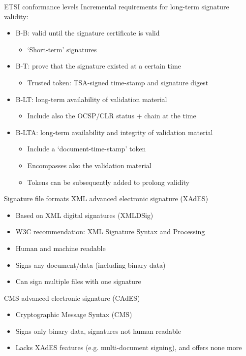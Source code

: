 \begin{frame}{ETSI conformance levels}
  \pause
  Incremental requirements for long-term signature validity:
  \begin{itemize}[<+(1)->]
    \item B-B: valid until the signature certificate is valid
    \begin{itemize}
      \item `Short-term' signatures
    \end{itemize}
    \item B-T: prove that the signature existed at a certain time
    \begin{itemize}
      \item Trusted token: TSA-signed time-stamp and signature digest
    \end{itemize}
    \item B-LT: long-term availability of validation material
    \begin{itemize}
      \item Include also the OCSP/CLR status + chain at the time
    \end{itemize}
    \item B-LTA: long-term availability and integrity of validation material
    \begin{itemize}
      \item Include a `document-time-stamp' token
      \item Encompasses also the validation material
      \item Tokens can be subsequently added to prolong validity
    \end{itemize}
  \end{itemize}
\end{frame}

\begin{frame}{Signature file formats}
    XML advanced electronic signature (XAdES)
    \begin{itemize}[<+(1)->]
      \item Based on XML digital signatures (XMLDSig)
      \item W3C recommendation: XML Signature Syntax and Processing
      \item Human and machine readable
      \item Signs any document/data (including binary data)
      \item Can sign multiple files with one signature
    \end{itemize}

    \pause
    CMS advanced electronic signature (CAdES)
    \begin{itemize}[<+(1)->]
      \item Cryptographic Message Syntax (CMS)
      \item Signs only binary data, signatures not human readable
      \item Lacks XAdES features (e.g. multi-document signing), and offers none more
    \end{itemize}
\end{frame}

